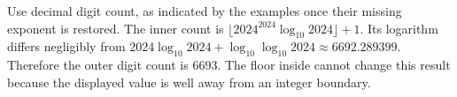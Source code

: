 Use decimal digit count, as indicated by the examples once their missing exponent is restored. The inner count is $\lfloor2024^{2024}\log_{10}2024\rfloor+1$. Its logarithm differs negligibly from $2024\log_{10}2024+\log_{10}\log_{10}2024\approx6692.289399$. Therefore the outer digit count is $\boxed{6693}$. The floor inside cannot change this result because the displayed value is well away from an integer boundary.
